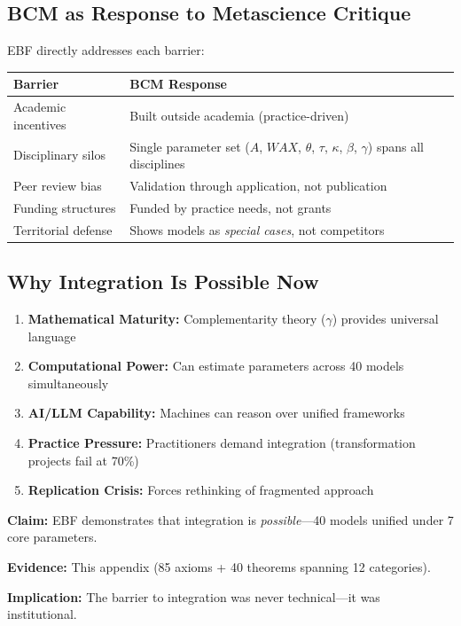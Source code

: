 \subsection{BCM as Response to Metascience Critique}

EBF directly addresses each barrier:

\begin{center}
\begin{tabular}{lp{8cm}}
\toprule
\textbf{Barrier} & \textbf{BCM Response} \\
\midrule
Academic incentives & Built outside academia (practice-driven) \\
Disciplinary silos & Single parameter set ($A$, $WAX$, $\theta$, $\tau$, $\kappa$, $\beta$, $\gamma$) spans all disciplines \\
Peer review bias & Validation through application, not publication \\
Funding structures & Funded by practice needs, not grants \\
Territorial defense & Shows models as \textit{special cases}, not competitors \\
\bottomrule
\end{tabular}
\end{center}

\subsection{Why Integration Is Possible Now}

\begin{enumerate}
\item \textbf{Mathematical Maturity:} Complementarity theory ($\gamma$) provides universal language
\item \textbf{Computational Power:} Can estimate parameters across 40 models simultaneously
\item \textbf{AI/LLM Capability:} Machines can reason over unified frameworks
\item \textbf{Practice Pressure:} Practitioners demand integration (transformation projects fail at 70\%)
\item \textbf{Replication Crisis:} Forces rethinking of fragmented approach
\end{enumerate}

\begin{tcolorbox}[colback=green!5!white, colframe=green!75!black,
    title=EBF: The Integration Proof]
\textbf{Claim:} EBF demonstrates that integration is \textit{possible}---40 models unified under 7 core parameters.

\textbf{Evidence:} This appendix (85 axioms + 40 theorems spanning 12 categories).

\textbf{Implication:} The barrier to integration was never technical---it was institutional.
\end{tcolorbox}

